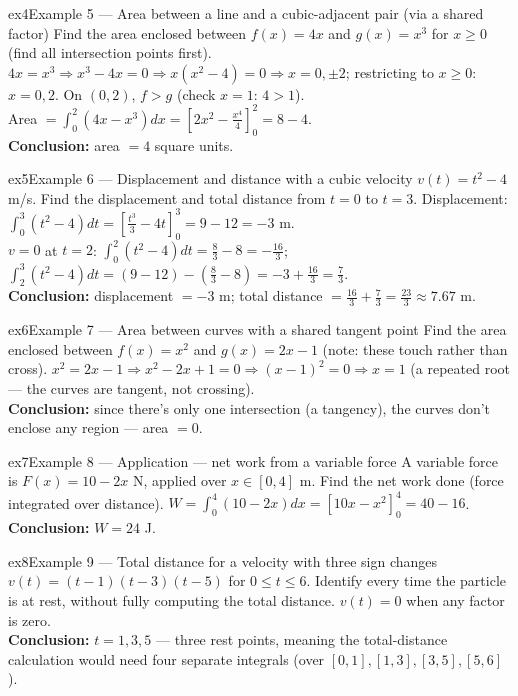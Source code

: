 \documentclass[11pt]{article}
\begin{document}
\begin{example}{ex4}{Example 5 --- Area between a line and a cubic-adjacent pair (via a shared factor)}
Find the area enclosed between $f(x)=4x$ and $g(x)=x^3$ for $x\geq0$ (find all intersection points first).\soln
$4x=x^3\Rightarrow x^3-4x=0\Rightarrow x(x^2-4)=0\Rightarrow x=0,\pm2$; restricting to $x\geq0$: $x=0,2$. On $(0,2)$, $f>g$ (check $x=1$: $4>1$).\\[3pt]
Area $=\int_0^2(4x-x^3)dx=\left[2x^2-\tfrac{x^4}4\right]_0^2=8-4$.\\[3pt]\textbf{Conclusion:} area $=4$ square units.
\end{example}

\begin{example}{ex5}{Example 6 --- Displacement and distance with a cubic velocity}
$v(t)=t^2-4$ m/s. Find the displacement and total distance from $t=0$ to $t=3$.\soln
Displacement: $\int_0^3(t^2-4)dt=\left[\tfrac{t^3}3-4t\right]_0^3=9-12=-3$ m.\\[3pt]
$v=0$ at $t=2$: $\int_0^2(t^2-4)dt=\tfrac83-8=-\tfrac{16}3$; $\int_2^3(t^2-4)dt=(9-12)-(\tfrac83-8)=-3+\tfrac{16}3=\tfrac73$.\\[3pt]\textbf{Conclusion:} displacement $=-3$ m; total distance $=\tfrac{16}3+\tfrac73=\tfrac{23}3\approx7.67$ m.
\end{example}

\begin{example}{ex6}{Example 7 --- Area between curves with a shared tangent point}
Find the area enclosed between $f(x)=x^2$ and $g(x)=2x-1$ (note: these touch rather than cross).\soln
$x^2=2x-1\Rightarrow x^2-2x+1=0\Rightarrow(x-1)^2=0\Rightarrow x=1$ (a repeated root --- the curves are tangent, not crossing).\\[3pt]\textbf{Conclusion:} since there's only one intersection (a tangency), the curves don't enclose any region --- area $=0$.
\end{example}

\begin{example}{ex7}{Example 8 --- Application --- net work from a variable force}
A variable force is $F(x)=10-2x$ N, applied over $x\in[0,4]$ m. Find the net work done (force integrated over distance).\soln
$W=\int_0^4(10-2x)dx=[10x-x^2]_0^4=40-16$.\\[3pt]\textbf{Conclusion:} $W=24$ J.
\end{example}

\begin{example}{ex8}{Example 9 --- Total distance for a velocity with three sign changes}
$v(t)=(t-1)(t-3)(t-5)$ for $0\leq t\leq6$. Identify every time the particle is at rest, without fully computing the total distance.\soln
$v(t)=0$ when any factor is zero.\\[3pt]\textbf{Conclusion:} $t=1,3,5$ --- three rest points, meaning the total-distance calculation would need four separate integrals (over $[0,1],[1,3],[3,5],[5,6]$).
\end{example}
\end{document}
